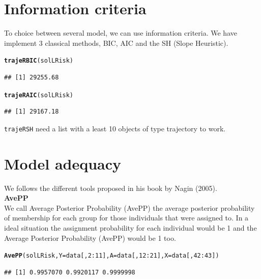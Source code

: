 \documentclass{article}\usepackage[]{graphicx}\usepackage[]{color}
\makeatletter
\newcommand{\hlnum}[1]{\textcolor[rgb]{0.686,0.059,0.569}{#1}}%
\newcommand{\hlopt}[1]{\textcolor[rgb]{0,0,0}{#1}}%
\newcommand{\hlstd}[1]{\textcolor[rgb]{0.345,0.345,0.345}{#1}}%
\newcommand{\hlkwc}[1]{\textcolor[rgb]{0.333,0.667,0.333}{#1}}%
\newcommand{\hlkwd}[1]{\textcolor[rgb]{0.737,0.353,0.396}{\textbf{#1}}}%
\newenvironment{kframe}{%
 \def\at@end@of@kframe{}%
 \ifinner\ifhmode%
  \def\at@end@of@kframe{\end{minipage}}%
  \begin{minipage}{\columnwidth}%
 \fi\fi%
 \def\FrameCommand##1{\hskip\@totalleftmargin \hskip-\fboxsep
 \colorbox{shadecolor}{##1}\hskip-\fboxsep
     \hskip-\linewidth \hskip-\@totalleftmargin \hskip\columnwidth}%
 \MakeFramed {\advance\hsize-\width
   \@totalleftmargin\z@ \linewidth\hsize
   \@setminipage}}%
 {\par\unskip\endMakeFramed%
 \at@end@of@kframe}
\newenvironment{knitrout}{}{} %
\makeatother
\begin{document}
\section{Information criteria}

To choice between several model, we can use information criteria. We have implement 3 classical methods, BIC, AIC and the SH (Slope Heuristic).

\begin{knitrout}
\color{fgcolor}\begin{kframe}
\begin{alltt}
\hlkwd{trajeRBIC}\hlstd{(solLRisk)}
\end{alltt}
\begin{verbatim}
## [1] 29255.68
\end{verbatim}
\begin{alltt}
\hlkwd{trajeRAIC}\hlstd{(solLRisk)}
\end{alltt}
\begin{verbatim}
## [1] 29167.18
\end{verbatim}
\end{kframe}
\end{knitrout}

\verb|trajeRSH|  need a list with a least 10 objects of type trajectory to work.

\section{Model adequacy}

We follows the different tools proposed in his book by Nagin (2005).\\

\textbf{AvePP}\\

We call Average Posterior Probability (AvePP) the average posterior probability of membership for each group for those individuals that were assigned to. In a ideal situation the assignment probability for each individual would be 1 and the Average Posterior Probability (AvePP) would be 1 too.

\begin{knitrout}
\color{fgcolor}\begin{kframe}
\begin{alltt}
\hlkwd{AvePP}\hlstd{(solLRisk,} \hlkwc{Y} \hlstd{= data[,}\hlnum{2}\hlopt{:}\hlnum{11}\hlstd{],} \hlkwc{A} \hlstd{= data[,}\hlnum{12}\hlopt{:}\hlnum{21}\hlstd{],} \hlkwc{X} \hlstd{= data[,} \hlnum{42}\hlopt{:}\hlnum{43}\hlstd{])}
\end{alltt}
\begin{verbatim}
## [1] 0.9957070 0.9920117 0.9999998
\end{verbatim}
\end{kframe}
\end{knitrout}
\end{document}
